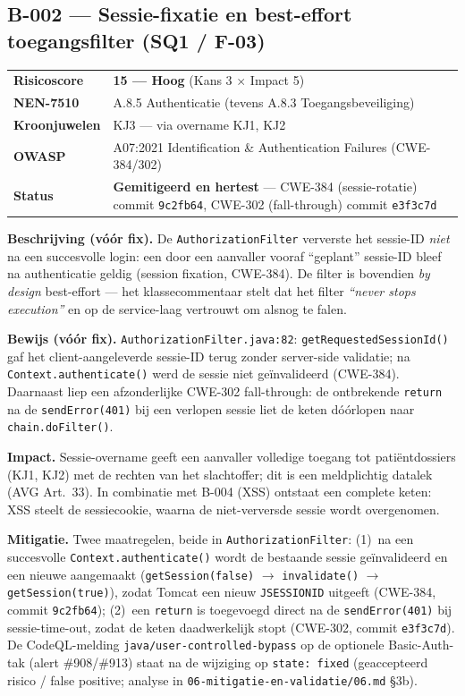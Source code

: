 \documentclass[12pt, a4paper]{report}
\newcommand{\rood}[1]{\textcolor{avansRed}{\textbf{#1}}}
\newcommand{\groen}[1]{\textcolor{ragGreen}{\textbf{#1}}}
\begin{document}
\subsection{B-002 --- Sessie-fixatie en best-effort toegangsfilter (SQ1 / F-03)}
\label{sec:b002}

\begin{tabular}{@{}l >{\raggedright\arraybackslash}p{11.4cm}@{}}
\textbf{Risicoscore} & \rood{15 --- Hoog} (Kans 3 $\times$ Impact 5) \\
\textbf{NEN-7510}    & A.8.5 Authenticatie (tevens A.8.3 Toegangsbeveiliging) \\
\textbf{Kroonjuwelen}& KJ3 --- via overname KJ1, KJ2 \\
\textbf{OWASP}       & A07:2021 Identification \& Authentication Failures (CWE-384/302) \\
\textbf{Status}      & \groen{Gemitigeerd en hertest} --- CWE-384 (sessie-rotatie) commit \texttt{9c2fb64}, CWE-302 (fall-through) commit \texttt{e3f3c7d} \\
\end{tabular}

\textbf{Beschrijving (vóór fix).} De \texttt{AuthorizationFilter} ververste het
sessie-ID \emph{niet} na een succesvolle login: een door een aanvaller vooraf
``geplant'' sessie-ID bleef na authenticatie geldig (session fixation, CWE-384).
De filter is bovendien \emph{by design} best-effort --- het klassecommentaar stelt
dat het filter \emph{``never stops execution''} en op de service-laag vertrouwt om
alsnog te falen.

\textbf{Bewijs (vóór fix).} \texttt{AuthorizationFilter.java:82}:
\texttt{getRequestedSessionId()} gaf het client-aangeleverde sessie-ID terug
zonder server-side validatie; na \texttt{Context.authenticate()} werd de sessie
niet geïnvalideerd (CWE-384). Daarnaast liep een afzonderlijke CWE-302
fall-through: de ontbrekende \texttt{return} na de \texttt{sendError(401)} bij een
verlopen sessie liet de keten dóórlopen naar \texttt{chain.doFilter()}.

\textbf{Impact.} Sessie-overname geeft een aanvaller volledige toegang tot
patiëntdossiers (KJ1, KJ2) met de rechten van het slachtoffer; dit is een meldplichtig
datalek (AVG Art.~33). In combinatie met B-004 (XSS) ontstaat een complete keten:
XSS steelt de sessiecookie, waarna de niet-verversde sessie wordt overgenomen.

\textbf{Mitigatie.} Twee maatregelen, beide in \texttt{AuthorizationFilter}:
(1)~na een succesvolle \texttt{Context.authenticate()} wordt de bestaande sessie
geïnvalideerd en een nieuwe aangemaakt (\texttt{getSession(false)} $\to$
\texttt{invalidate()} $\to$ \texttt{getSession(true)}), zodat Tomcat een nieuw
\texttt{JSESSIONID} uitgeeft (CWE-384, commit \texttt{9c2fb64}); (2)~een
\texttt{return} is toegevoegd direct na de \texttt{sendError(401)} bij sessie-time-out,
zodat de keten daadwerkelijk stopt (CWE-302, commit \texttt{e3f3c7d}). De
CodeQL-melding \texttt{java/user-controlled-bypass} op de optionele
Basic-Auth-tak (alert \#908/\#913) staat na de wijziging op \texttt{state: fixed}
(geaccepteerd risico / false positive; analyse in
\texttt{06-mitigatie-en-validatie/06.md} \S3b).
\end{document}
